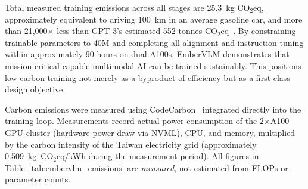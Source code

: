 \begin{table}[htbp]
\centering
\caption{\textbf{Training carbon emissions (CodeCarbon-measured).} All values are measured, not estimated. Training on 2$\times$A100 GPUs.}
\label{tab:embervlm_emissions}
\end{table}

Total measured training emissions across all stages are 25.3~kg CO$_2$eq, approximately equivalent to driving 100~km in an average gasoline car, and more than 21{,}000$\times$ less than GPT-3's estimated 552 tonnes CO$_2$eq~\cite{patterson2021carbon}. By constraining trainable parameters to 40M and completing all alignment and instruction tuning within approximately 90 hours on dual A100s, EmberVLM demonstrates that mission-critical capable multimodal AI can be trained sustainably. This positions low-carbon training not merely as a byproduct of efficiency but as a first-class design objective.

Carbon emissions were measured using CodeCarbon~\cite{codecarbon} integrated directly into the training loop. Measurements record actual power consumption of the 2$\times$A100 GPU cluster (hardware power draw via NVML), CPU, and memory, multiplied by the carbon intensity of the Taiwan electricity grid (approximately 0.509~kg~CO$_2$eq/kWh during the measurement period). All figures in Table~\ref{tab:embervlm_emissions} are \emph{measured}, not estimated from FLOPs or parameter counts.
